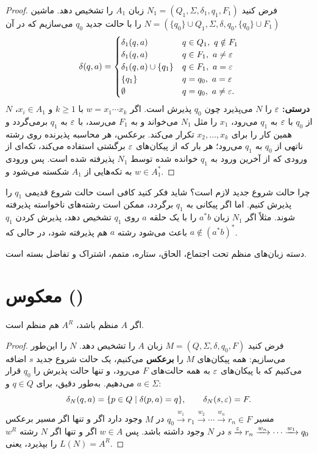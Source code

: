 \begin{proof}
فرض کنید $N_1=(Q_1,\Sigma,\delta_1,q_1,F_1)$ زبان $A_1$ را تشخیص دهد. ماشین $N=(\{q_0\}\cup Q_1,\Sigma,\delta,q_0,\{q_0\}\cup F_1)$ را با حالت جدید $q_0$ می‌سازیم که در آن
\[\delta(q,a)=\begin{cases}
\delta_1(q,a) & q\in Q_1,\ q\notin F_1\\
\delta_1(q,a) & q\in F_1,\ a\neq\varepsilon\\
\delta_1(q,a)\cup\{q_1\} & q\in F_1,\ a=\varepsilon\\
\{q_1\} & q=q_0,\ a=\varepsilon\\
\emptyset & q=q_0,\ a\neq\varepsilon.
\end{cases}\]
\textbf{درستی:} $\varepsilon$ را $N$ می‌پذیرد چون $q_0$ پذیرش است. اگر $w=x_1\cdots x_k$ با $k\ge1$ و $x_i\in A_1$، $N$ از $q_0$ با $\varepsilon$ به $q_1$ می‌رود، $x_1$ را مثل $N_1$ می‌خواند و به $F_1$ می‌رسد، با $\varepsilon$ به $q_1$ برمی‌گردد و همین کار را برای $x_2,\dots,x_k$ تکرار می‌کند. برعکس، هر محاسبه پذیرنده روی رشته ناتهی از $q_0$ به $q_1$ می‌رود؛ هر بار که از پیکان‌های $\varepsilon$ برگشتی استفاده می‌کند، تکه‌ای از ورودی که از آخرین ورود به $q_1$ خوانده شده توسط $N_1$ پذیرفته شده است. پس ورودی به تکه‌هایی از $A_1$ شکسته می‌شود و $w\in A_1^*$.
\end{proof}

\begin{warning}
چرا حالت شروع جدید لازم است؟ شاید فکر کنید کافی است حالت شروع قدیمی $q_1$ را پذیرش کنیم. اما اگر پیکانی به $q_1$ برگردد، ممکن است رشته‌های ناخواسته پذیرفته شوند. مثلاً اگر $N_1$ زبان $a^*b$ را با یک حلقه $a$ روی $q_1$ تشخیص دهد، پذیرش کردن $q_1$ باعث می‌شود رشته $a$ هم پذیرفته شود، در حالی که $a\notin(a^*b)^*$.
\end{warning}

\begin{corollary}
دسته زبان‌های منظم تحت اجتماع، الحاق، ستاره، متمم، اشتراک و تفاضل بسته است.
\end{corollary}

\section{معکوس ()}

\begin{theorem}\label{thm:reg-reverse}
اگر $A$ منظم باشد، $A^R$ هم منظم است.
\end{theorem}
\begin{proof}
فرض کنید  $M=(Q,\Sigma,\delta,q_0,F)$ زبان $A$ را تشخیص دهد.  $N$ را این‌طور می‌سازیم: همه پیکان‌های $M$ را \textbf{برعکس} می‌کنیم، یک حالت شروع جدید $s$ اضافه می‌کنیم که با پیکان‌های $\varepsilon$ به همه حالت‌های $F$ می‌رود، و تنها حالت پذیرش را $q_0$ قرار می‌دهیم. به‌طور دقیق، برای $q\in Q$ و $a\in\Sigma$:
\[\delta_N(q,a)=\{p\in Q\mid \delta(p,a)=q\},\qquad \delta_N(s,\varepsilon)=F.\]
مسیر $q_0\xrightarrow{w_1}r_1\xrightarrow{w_2}\cdots\xrightarrow{w_n}r_n\in F$ در $M$ وجود دارد اگر و تنها اگر مسیر برعکس $s\xrightarrow{\varepsilon}r_n\xrightarrow{w_n}\cdots\xrightarrow{w_1}q_0$ در $N$ وجود داشته باشد. پس $w\in A$ اگر و تنها اگر $N$ رشته $w^R$ را بپذیرد، یعنی $L(N)=A^R$.
\end{proof}

